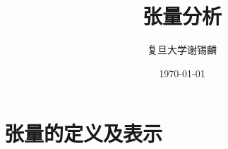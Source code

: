 \documentclass[oneside]{book}
\title{
	\vspace{-4 cm} \color{Sienna} \Huge 张量分析
}
\author{
	\CJKfamily{楷体} \color{DarkRed} \Large 复旦大学\phantom{空格}谢锡麟
}
\date{
	\CJKfamily{楷体} \color{Goldenrod} \Large \today
}
\theoremstyle{nonumberplain} %
\begin{document}
%	
%	
	\chapter{张量的定义及表示}
		
	
%		
\end{document}
